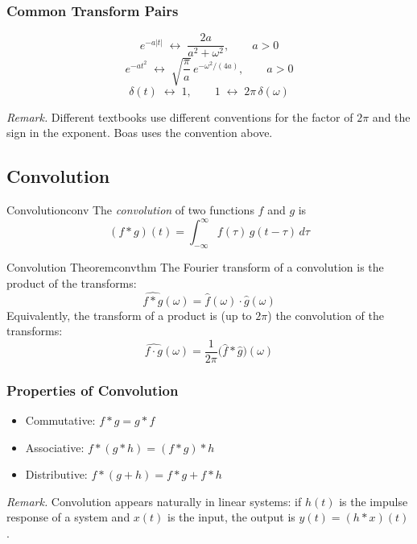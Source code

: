 \documentclass[11pt, letterpaper]{article}
\theoremstyle{plain}
\newenvironment{remark}{\smallskip\noindent\textit{Remark.}}{\smallskip}
\begin{document}
\subsubsection*{Common Transform Pairs}
 
\[
    e^{-a|t|} \;\longleftrightarrow\; \frac{2a}{a^2 + \omega^2}, \qquad a > 0
\]
\[
    e^{-at^2} \;\longleftrightarrow\; \sqrt{\frac{\pi}{a}}\,e^{-\omega^2/(4a)},
    \qquad a > 0
\]
\[
    \delta(t) \;\longleftrightarrow\; 1, \qquad
    1 \;\longleftrightarrow\; 2\pi\,\delta(\omega)
\]
 
\begin{remark}
    Different textbooks use different conventions for the factor of $2\pi$
    and the sign in the exponent. Boas uses the convention above.
\end{remark}

\subsection{Convolution}
 
\begin{definition}{Convolution}{conv}
    The \emph{convolution} of two functions $f$ and $g$ is
    \[
        (f * g)(t) = \int_{-\infty}^{\infty} f(\tau)\,g(t - \tau)\,d\tau
    \]
\end{definition}
 
\begin{theorem}{Convolution Theorem}{convthm}
    The Fourier transform of a convolution is the product of the transforms:
    \[
        \widehat{f * g}(\omega) = \hat{f}(\omega)\cdot\hat{g}(\omega)
    \]
    Equivalently, the transform of a product is (up to $2\pi$) the
    convolution of the transforms:
    \[
        \widehat{f \cdot g}(\omega)
        = \frac{1}{2\pi}\bigl(\hat{f} * \hat{g}\bigr)(\omega)
    \]
\end{theorem}
 
\subsubsection*{Properties of Convolution}
\begin{itemize}
    \item Commutative: $f * g = g * f$
    \item Associative: $f * (g * h) = (f * g) * h$
    \item Distributive: $f * (g + h) = f*g + f*h$
\end{itemize}
 
\begin{remark}
    Convolution appears naturally in linear systems: if $h(t)$ is the
    impulse response of a system and $x(t)$ is the input, the output is
    $y(t) = (h * x)(t)$.
\end{remark}
\end{document}
